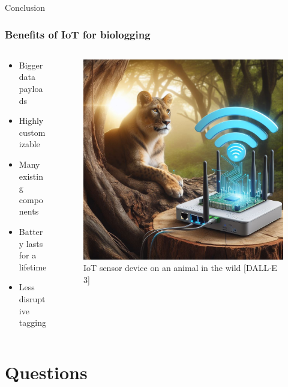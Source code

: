 \documentclass{beamer}
\begin{document}
\begin{frame}{Conclusion}
  \frametitle{Benefits of IoT for biologging}
  \begin{columns}
    \begin{column}{0.5\textwidth}
      \begin{itemize}
        \item Bigger data payloads
        \item Highly customizable
        \item Many existing components
        \item Battery lasts for a lifetime
        \item Less disruptive tagging
      \end{itemize}
    \end{column}
    \begin{column}{0.5\textwidth}
      \begin{figure}[htbp]
        \centering
        \includegraphics[width=.9\textwidth]{IoT_Lion.jpg}
        \caption{IoT sensor device on an animal in the wild [DALL$\cdot$E 3]}
        \label{fig:IoT_Lion}
      \end{figure}
    \end{column}
  \end{columns}
\end{frame}

\section{Questions}
\end{document}
